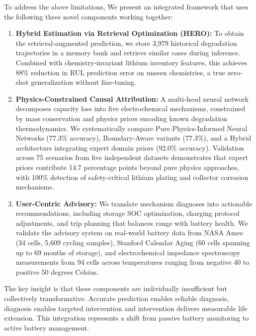 \documentclass[5p,times,authoryear]{elsarticle}
\begin{document}

To address the above limitations, We present an integrated framework that uses the following three novel components working together:

\begin{enumerate}
    \item \textbf{Hybrid Estimation via Retrieval Optimization (HERO):} To obtain the retrieval-augmented prediction, we store 3,979 historical degradation trajectories in a memory bank and retrieve similar cases during inference. Combined with chemistry-invariant lithium inventory features, this achieves 88\% reduction in RUL prediction error on unseen chemistries, a true zero-shot generalization without fine-tuning.
    
    \item \textbf{Physics-Constrained Causal Attribution:} A multi-head neural network decomposes capacity loss into five electrochemical mechanisms, constrained by mass conservation and physics priors encoding known degradation thermodynamics. We systematically compare Pure Physics-Informed Neural Networks (77.3\% accuracy), Boundary-Aware variants (77.3\%), and a Hybrid architecture integrating expert domain priors (92.0\% accuracy). Validation across 75 scenarios from five independent datasets demonstrates that expert priors contribute 14.7 percentage points beyond pure physics approaches, with 100\% detection of safety-critical lithium plating and collector corrosion mechanisms.
    
    \item \textbf{User-Centric Advisory:} We translate mechanism diagnoses into actionable recommendations, including storage SOC optimization, charging protocol adjustments, and trip planning that balances range with battery health. We validate the advisory system on real-world battery data from NASA Ames (34 cells, 5,609 cycling samples), Stanford Calendar Aging (60 cells spanning up to 69 months of storage), and electrochemical impedance spectroscopy measurements from 94 cells across temperatures ranging from negative 40 to positive 50 degrees Celsius.
\end{enumerate}

The key insight is that these components are individually insufficient but collectively transformative. Accurate prediction enables reliable diagnosis, diagnosis enables targeted intervention and intervention delivers measurable life extension. This integration represents a shift from passive battery monitoring to active battery management.
\end{document}
